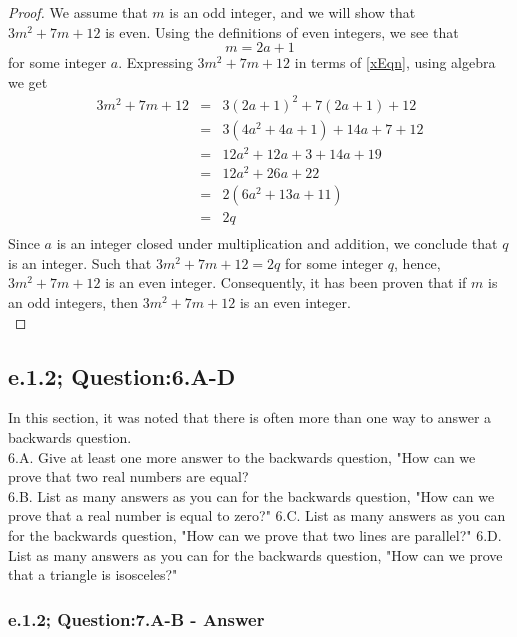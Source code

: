 \begin{proof}
We assume that $m$ is an odd integer, and we will show that $3m^2 + 7m + 12$ is even. Using the definitions of even integers, we see that
\begin{equation}
\label{xEqn}
m = 2a + 1
\end{equation}
for some integer $a$. Expressing $3m^2 + 7m + 12$ in terms of \ref{xEqn}, using algebra we get
\begin{eqnarray*}
3m^2 + 7m + 12 & = & 3(2a + 1)^2 + 7(2a + 1) + 12  \nonumber \\
& = & 3(4a^2 + 4a + 1) + 14a + 7 + 12 \nonumber \\
& = & 12a^2 + 12a + 3 + 14a + 19 \nonumber \\
& = & 12a^2 + 26a + 22 \nonumber \\
& = & 2(6a^2 + 13a + 11)\nonumber \\
& = & 2q \nonumber \\
\end{eqnarray*}
Since $a$ is an integer closed under multiplication and addition, we conclude that $q$ is an integer. Such that $3m^2 + 7m + 12 = 2q$ for some integer $q$, hence, $3m^2 + 7m + 12$ is an even integer. Consequently, it has been proven that if $m$ is an odd integers, then $3m^2 + 7m + 12$ is an even integer. \\
\end{proof}



\subsection{e.1.2; Question:6.A-D}
In this section, it was noted that there is often more than one way to answer a backwards question. \\

6.A. Give at least one more answer to the backwards question, "How can we prove that two real numbers are equal? \\
6.B. List as many answers as you can for the backwards question, "How can we prove that a real number is equal to zero?"
6.C. List as many answers as you can for the backwards question, "How can we prove that two lines are parallel?"
6.D. List as many answers as you can for the backwards question, "How can we prove that a triangle is isosceles?"

\subsubsection*{e.1.2; Question:7.A-B - Answer}

